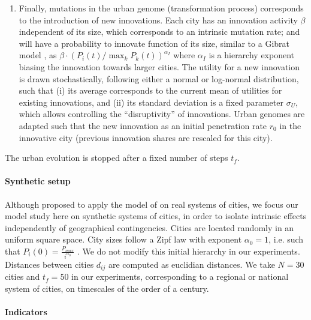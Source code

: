 \documentclass[letterpaper]{article}
\begin{document}
\begin{enumerate}
 \item Finally, mutations in the urban genome (transformation process) corresponds to the introduction of new innovations. Each city has an innovation activity $\beta$ independent of its size, which corresponds to an intrinsic mutation rate; and will have a probability to innovate function of its size, similar to a Gibrat model \citep{pumain2012theorie}, as $\beta \cdot \left(P_i (t) / \max_k P_k (t)\right)^{\alpha_I}$ where $\alpha_I$ is a hierarchy exponent biasing the innovation towards larger cities. The utility for a new innovation is drawn stochastically, following either a normal or log-normal distribution, such that (i) its average corresponds to the current mean of utilities for existing innovations, and (ii) its standard deviation is a fixed parameter $\sigma_U$, which allows controlling the ``disruptivity'' of innovations. Urban genomes are adapted such that the new innovation as an initial penetration rate $r_0$ in the innovative city (previous innovation shares are rescaled for this city).
\end{enumerate}

The urban evolution is stopped after a fixed number of steps $t_f$.

\paragraph{Synthetic setup}

Although \cite{raimbault:halshs-01880492} proposed to apply the model of \cite{favaro2011gibrat} on real systems of cities, we focus our model study here on synthetic systems of cities, in order to isolate intrinsic effects independently of geographical contingencies. Cities are located randomly in an uniform square space. City sizes follow a Zipf law with exponent $\alpha_0 = 1$, i.e. such that $P_i (0) = \frac{P_{max}}{i^{\alpha_0}}$ \citep{pumain2012theorie}. We do not modify this initial hierarchy in our experiments. Distances between cities $d_{ij}$ are computed as euclidian distances. We take $N=30$ cities and $t_f = 50$ in our experiments, corresponding to a regional or national system of cities, on timescales of the order of a century.


\paragraph{Indicators}

\end{document}
